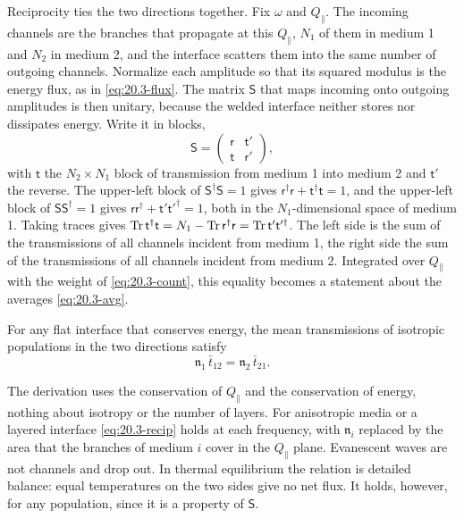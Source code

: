 Reciprocity ties the two directions together. Fix $\omega$ and $Q_\parallel$. The incoming channels are the branches that propagate at this $Q_\parallel$, $N_1$ of them in medium 1 and $N_2$ in medium 2, and the interface scatters them into the same number of outgoing channels. Normalize each amplitude so that its squared modulus is the energy flux, as in \cref{eq:20.3-flux}. The matrix $\mathsf{S}$ that maps incoming onto outgoing amplitudes is then unitary, because the welded interface neither stores nor dissipates energy. Write it in blocks,
\begin{equation*}
  \mathsf{S} = \begin{pmatrix} \mathsf{r} & \mathsf{t}' \\ \mathsf{t} & \mathsf{r}' \end{pmatrix} ,
\end{equation*}
with $\mathsf{t}$ the $N_2\times N_1$ block of transmission from medium 1 into medium 2 and $\mathsf{t}'$ the reverse. The upper-left block of $\mathsf{S}^\dagger\mathsf{S} = 1$ gives $\mathsf{r}^\dagger\mathsf{r} + \mathsf{t}^\dagger\mathsf{t} = 1$, and the upper-left block of $\mathsf{S}\mathsf{S}^\dagger = 1$ gives $\mathsf{r}\mathsf{r}^\dagger + \mathsf{t}'\mathsf{t}'^\dagger = 1$, both in the $N_1$-dimensional space of medium 1. Taking traces gives $\operatorname{Tr}\mathsf{t}^\dagger\mathsf{t} = N_1 - \operatorname{Tr}\mathsf{r}^\dagger\mathsf{r} = \operatorname{Tr}\mathsf{t}'\mathsf{t}'^\dagger$. The left side is the sum of the transmissions of all channels incident from medium 1, the right side the sum of the transmissions of all channels incident from medium 2. Integrated over $Q_\parallel$ with the weight of \cref{eq:20.3-count}, this equality becomes a statement about the averages \cref{eq:20.3-avg}.
\begin{keyresult}
For any flat interface that conserves energy, the mean transmissions of isotropic populations in the two directions satisfy
\begin{equation}
  \mathfrak{n}_1\,\bar t_{12} = \mathfrak{n}_2\,\bar t_{21} .
  \label{eq:20.3-recip}
\end{equation}
\end{keyresult}
The derivation uses the conservation of $Q_\parallel$ and the conservation of energy, nothing about isotropy or the number of layers. For anisotropic media or a layered interface \cref{eq:20.3-recip} holds at each frequency, with $\mathfrak{n}_i$ replaced by the area that the branches of medium $i$ cover in the $Q_\parallel$ plane. Evanescent waves are not channels and drop out. In thermal equilibrium the relation is detailed balance: equal temperatures on the two sides give no net flux. It holds, however, for any population, since it is a property of $\mathsf{S}$.

